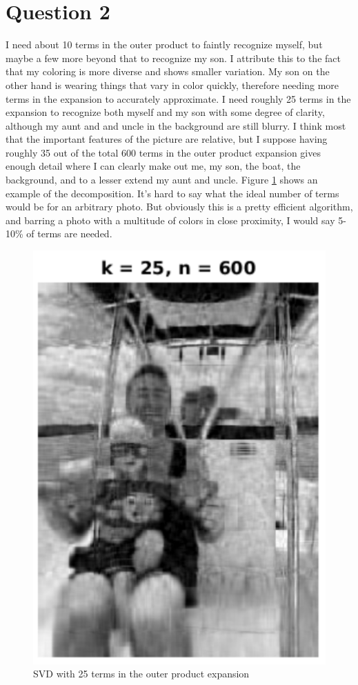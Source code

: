 \documentclass[a4paper,12pt]{article}
\begin{document}
\section{Question 2 }
I need about 10 terms in the outer product to faintly recognize myself, but maybe a few more beyond that to recognize my son. I attribute this to the fact that my coloring is more diverse and shows smaller variation. My son on the other hand is wearing things that vary in color quickly, therefore needing more terms in the expansion to accurately approximate. I need roughly 25 terms in the expansion to recognize both myself and my son with some degree of clarity, although my aunt and and uncle in the background are still blurry. I think most that the important features of the picture are relative, but I suppose having roughly 35 out of the total 600 terms in the outer product expansion gives enough detail where I can clearly make out me, my son, the boat, the background, and to a lesser extend my aunt and uncle. Figure \ref{fig:boat1} shows an example of the decomposition. It's hard to say what the ideal number of terms would be for an arbitrary photo. But obviously this is a pretty efficient algorithm, and barring a photo with a multitude of colors in close proximity, I would say 5-10\% of terms are needed.
\begin{figure}[h]
  \includegraphics[scale=0.5]{k25.png}
  \caption{SVD with 25 terms in the outer product expansion}
  \label{fig:boat1}
\end{figure}
\end{document}
